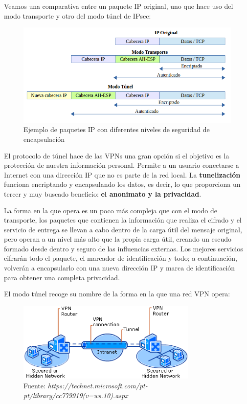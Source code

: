 Veamos una comparativa entre un paquete IP original, uno que hace uso
del modo transporte y otro del modo túnel de IPsec:

	\begin{figure}[h]
		\centerline{
			\mbox{\includegraphics[width=5.00in]{images/IPsec.png}}
		}
		\caption{Ejemplo de paquetes IP con diferentes niveles de seguridad de encapsulación}
		\label{fig:norm_Daugman}
	\end{figure}

        El protocolo de túnel hace de las VPNs una gran opción si el
        objetivo es la protección de nuestra información personal.
        Permite a un usuario conectarse a Internet con una dirección
        IP que no es parte de la red local. La \textbf{tunelización}
        funciona encriptando y encapsulando los datos, es decir, lo
        que proporciona un tercer y muy buscado beneficio: \textbf{el
          anonimato y la privacidad}.

        La forma en la que opera es un poco más compleja que con el
        modo de transporte, los paquetes que contienen la información
        que realiza el cifrado y el servicio de entrega se llevan a
        cabo dentro de la carga útil del mensaje original, pero operan
        a un nivel más alto que la propia carga útil, creando un
        escudo formado desde dentro y seguro de las influencias
        externas. Los mejores servicios cifrarán todo el paquete, el
        marcador de identificación y todo; a continuación, volverán a
        encapsularlo con una nueva dirección IP y marca de
        identificación para obtener una completa privacidad.

        El modo túnel recoge su nombre de la forma en la que una red
        VPN opera:

  		\begin{figure}[h]
  			\centerline{
  				\mbox{\includegraphics[width=3.50in]{images/vpn.png}}
  			}
  			\caption{Fuente: \textit{https://technet.microsoft.com/pt-pt/library/cc779919(v=ws.10).aspx}}
  			\label{fig:norm_Daugman}
  		\end{figure}
 
